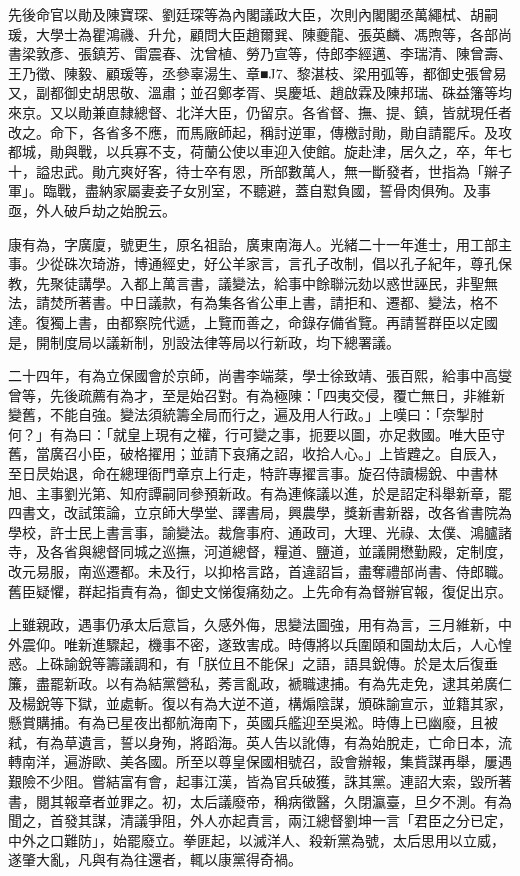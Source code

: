 \begin{pinyinscope}
先後命官以勛及陳寶琛、劉廷琛等為內閣議政大臣，次則內閣閣丞萬繩栻、胡嗣瑗，大學士為瞿鴻禨、升允，顧問大臣趙爾巽、陳夔龍、張英麟、馮煦等，各部尚書梁敦彥、張鎮芳、雷震春、沈曾植、勞乃宣等，侍郎李經邁、李瑞清、陳曾壽、王乃徵、陳毅、顧瑗等，丞參辜湯生、章■J7、黎湛枝、梁用弧等，都御史張曾易又，副都御史胡思敬、溫肅；並召鄭孝胥、吳慶坻、趙啟霖及陳邦瑞、硃益籓等均來京。又以勛兼直隸總督、北洋大臣，仍留京。各省督、撫、提、鎮，皆就現任者改之。命下，各省多不應，而馬廠師起，稱討逆軍，傳檄討勛，勛自請罷斥。及攻都城，勛與戰，以兵寡不支，荷蘭公使以車迎入使館。旋赴津，居久之，卒，年七十，謚忠武。勛亢爽好客，待士卒有恩，所部數萬人，無一斷發者，世指為「辮子軍」。臨戰，盡納家屬妻妾子女別室，不聽避，蓋自懟負國，誓骨肉俱殉。及事亟，外人破戶劫之始脫云。

康有為，字廣廈，號更生，原名祖詒，廣東南海人。光緒二十一年進士，用工部主事。少從硃次琦游，博通經史，好公羊家言，言孔子改制，倡以孔子紀年，尊孔保教，先聚徒講學。入都上萬言書，議變法，給事中餘聯沅劾以惑世誣民，非聖無法，請焚所著書。中日議款，有為集各省公車上書，請拒和、遷都、變法，格不達。復獨上書，由都察院代遞，上覽而善之，命錄存備省覽。再請誓群臣以定國是，開制度局以議新制，別設法律等局以行新政，均下總署議。

二十四年，有為立保國會於京師，尚書李端棻，學士徐致靖、張百熙，給事中高燮曾等，先後疏薦有為才，至是始召對。有為極陳：「四夷交侵，覆亡無日，非維新變舊，不能自強。變法須統籌全局而行之，遍及用人行政。」上嘆曰：「奈掣肘何？」有為曰：「就皇上現有之權，行可變之事，扼要以圖，亦足救國。唯大臣守舊，當廣召小臣，破格擢用；並請下哀痛之詔，收拾人心。」上皆韙之。自辰入，至日昃始退，命在總理衙門章京上行走，特許專擢言事。旋召侍讀楊銳、中書林旭、主事劉光第、知府譚嗣同參預新政。有為連條議以進，於是詔定科舉新章，罷四書文，改試策論，立京師大學堂、譯書局，興農學，獎新書新器，改各省書院為學校，許士民上書言事，諭變法。裁詹事府、通政司，大理、光祿、太僕、鴻臚諸寺，及各省與總督同城之巡撫，河道總督，糧道、鹽道，並議開懋勤殿，定制度，改元易服，南巡遷都。未及行，以抑格言路，首違詔旨，盡奪禮部尚書、侍郎職。舊臣疑懼，群起指責有為，御史文悌復痛劾之。上先命有為督辦官報，復促出京。

上雖親政，遇事仍承太后意旨，久感外侮，思變法圖強，用有為言，三月維新，中外震仰。唯新進驟起，機事不密，遂致害成。時傳將以兵圍頤和園劫太后，人心惶惑。上硃諭銳等籌議調和，有「朕位且不能保」之語，語具銳傳。於是太后復垂簾，盡罷新政。以有為結黨營私，莠言亂政，褫職逮捕。有為先走免，逮其弟廣仁及楊銳等下獄，並處斬。復以有為大逆不道，構煽陰謀，頒硃諭宣示，並籍其家，懸賞購捕。有為已星夜出都航海南下，英國兵艦迎至吳淞。時傳上已幽廢，且被弒，有為草遺言，誓以身殉，將蹈海。英人告以訛傳，有為始脫走，亡命日本，流轉南洋，遍游歐、美各國。所至以尊皇保國相號召，設會辦報，集貲謀再舉，屢遇艱險不少阻。嘗結富有會，起事江漢，皆為官兵破獲，誅其黨。連詔大索，毀所著書，閱其報章者並罪之。初，太后議廢帝，稱病徵醫，久閉瀛臺，旦夕不測。有為聞之，首發其謀，清議爭阻，外人亦起責言，兩江總督劉坤一言「君臣之分已定，中外之口難防」，始罷廢立。拳匪起，以滅洋人、殺新黨為號，太后思用以立威，遂肇大亂，凡與有為往還者，輒以康黨得奇禍。


\end{pinyinscope}
